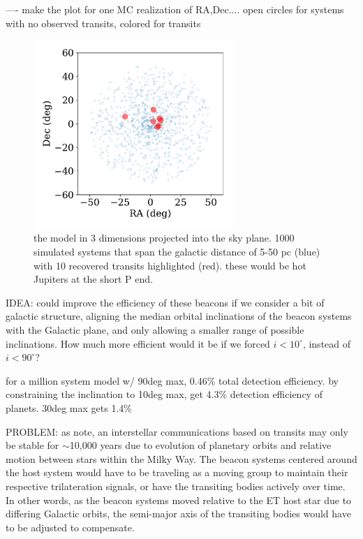 \documentclass[twocolumn]{aastex62}
\begin{document}
---- make the plot for one MC realization of RA,Dec.... open circles for systems with no observed transits, colored for transits

\begin{figure}[]
\centering
\includegraphics[width=3in]{../figures/3d_model.pdf}
\caption{the model in 3 dimensions projected into the sky plane. 1000 simulated systems that span the galactic distance of 5-50 pc (blue) with 10 recovered transits highlighted (red). these would be hot Jupiters at the short P end.}
\label{fig:3d}
\end{figure}



IDEA:
could improve the efficiency of these beacons if we consider a bit of galactic structure, aligning the median orbital inclinations of the beacon systems with the Galactic plane, and only allowing a smaller range of possible inclinations. How much more efficient would it be if we forced $i<10^\circ$, instead of $i<90^\circ$?

for a million system model w/ 90deg max, 0.46\% total detection efficiency. 
by constraining the inclination to 10deg max, get 4.3\% detection efficiency of planets. 30deg max gets 1.4\%


PROBLEM:
as \citet{forgan2017} note, an interstellar communications based on transits may only be stable for $\sim$10,000 years due to evolution of planetary orbits and relative motion between stars within the Milky Way. The beacon systems centered around the host system would have to be traveling as a moving group to maintain their respective trilateration signals, or have the transiting bodies actively over time. In other words, as the beacon systems moved relative to the ET host star due to differing Galactic orbits, the semi-major axis of the transiting bodies would have to be adjusted to compensate.
\end{document}
